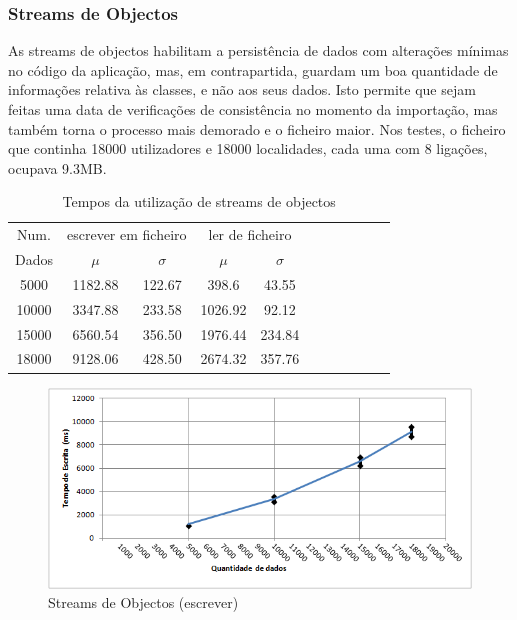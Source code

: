 \documentclass[a5paper,twocolumn, 11pt]{article}
\begin{document}
\subsubsection{Streams de Objectos}
As streams de objectos habilitam a persistência de dados com alterações mínimas no código da aplicação, mas, em contrapartida, guardam um boa quantidade de informações relativa às classes, e não aos seus dados.
Isto permite que sejam feitas uma data de verificações de consistência no momento da importação, mas também torna o processo mais demorado e o ficheiro maior. Nos testes, o ficheiro que continha 18000 utilizadores e 18000 localidades, cada uma com 8 ligações, ocupava 9.3MB.
\clearpage
\onecolumn
\begin{center}
    \begin{table}[h!b!t!]
    \begin{center}
    \caption{Tempos da utilização de streams de objectos}
    \begin{tabular}[hbt]{ | *{11}{c|} }
    \hline
        Num. & \multicolumn{2}{|c|}{escrever em ficheiro} & \multicolumn{2}{|c|}{ler de ficheiro}\\ %
        Dados & $\mu$ & $\sigma$ & $\mu$ & $\sigma$\\ \hline
        5000  & 1182.88 & 122.67 & 398.6 & 43.55\\ \hline
        10000 & 3347.88 & 233.58 & 1026.92 & 92.12\\ \hline
        15000 & 6560.54 & 356.50 & 1976.44 & 234.84\\ \hline
        18000 & 9128.06 & 428.50 & 2674.32 & 357.76\\ \hline
    \end{tabular}
\end{center}
\end{table}
\end{center}
\begin{figure}[h!b!t!]
    \caption[Streams de Objectos (escrever)]{Streams de Objectos (escrever)}
    \centering
        \includegraphics[width=400pt]{sdo_1.png}
\end{figure}
\end{document}
